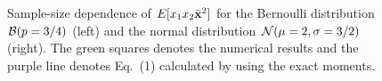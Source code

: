 \documentclass[a4paper]{article}
\newcommand{\ex}[1]{E[ #1 ]}
\newcommand{\xb}{\bar{\bf x}}
\begin{document}
\begin{figure}
  \begin{center}
  \end{center}
  \caption{Sample-size dependence of $\ex{x_1 x_2 \xb^2}$ for the Bernoulli distribution ${\cal B}(p=3/4)$ (left) and the normal distribution ${\cal N}(\mu=2,\sigma=3/2)$ (right). The green squares denotes the numerical results and the purple line denotes Eq.~(1) calculated by using the exact moments.}
\end{figure}
\end{document}

